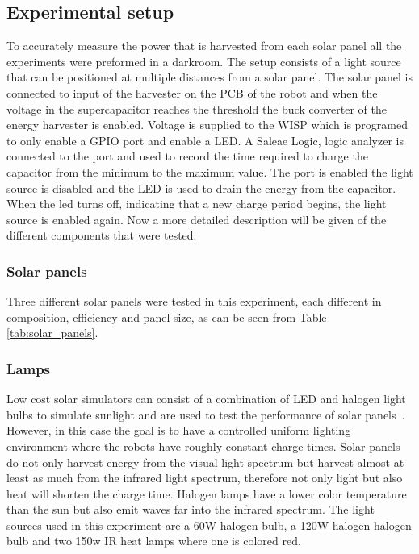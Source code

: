 \subsection{Experimental setup}
To accurately measure the power that is harvested from each solar panel all the experiments were preformed in a darkroom.
The setup consists of a light source that can be positioned at multiple distances from a solar panel.
The solar panel is connected to input of the harvester on the PCB of the robot and when the voltage in the supercapacitor reaches the threshold the buck converter of the energy harvester is enabled.
Voltage is supplied to the WISP which is programed to only enable a GPIO port and enable a LED.
A Saleae Logic, logic analyzer is connected to the port and used to record the time required to charge the capacitor from the minimum to the maximum value.
The port is enabled the light source is disabled and the LED is used to drain the energy from the capacitor.
When the led turns off, indicating that a new charge period begins, the light source is enabled again.
Now a more detailed description will be given of the different components that were tested.

\subsubsection{Solar panels}
Three different solar panels were tested in this experiment, each different in composition, efficiency and panel size, as can be seen from Table \ref{tab:solar_panels}.

\subsubsection{Lamps}
Low cost solar simulators can consist of a combination of LED and halogen light bulbs to simulate sunlight and are used to test the performance of solar panels~\cite{grandi_tia_2014}.
However, in this case the goal is to have a controlled uniform lighting environment where the robots have roughly constant charge times.
Solar panels do not only harvest energy from the visual light spectrum but harvest almost at least as much from the infrared light spectrum, therefore not only light but also heat will shorten the charge time.
Halogen lamps have a lower color temperature than the sun but also emit waves far into the infrared spectrum.
The light sources used in this experiment are a 60W halogen bulb, a 120W halogen halogen bulb and two 150w IR heat lamps where one is colored red.

